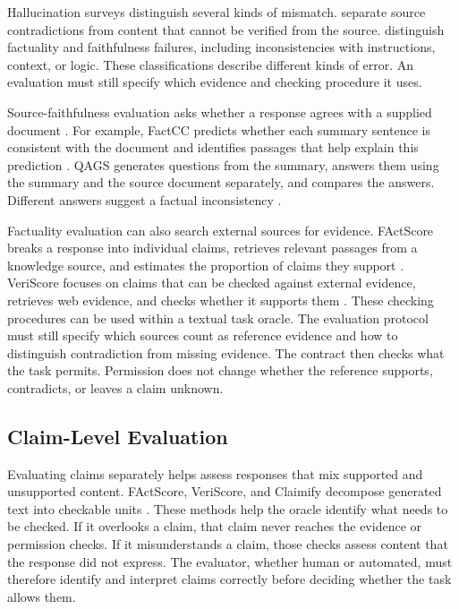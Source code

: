\documentclass{clv2025}
\begin{document}
Hallucination surveys distinguish several kinds of mismatch.
\citet{ji_survey_2023} separate source contradictions from content that cannot
be verified from the source. \citet{huang_survey_2025} distinguish factuality
and faithfulness failures, including inconsistencies with instructions,
context, or logic. These classifications describe different kinds of error.
An evaluation must still specify which evidence and checking procedure it uses.

Source-faithfulness evaluation asks whether a response agrees with a supplied
document \citep{maynez_faithfulness_2020}. For example, FactCC predicts whether
each summary sentence is consistent with the document and identifies
passages that help explain this prediction \citep{kryscinski_evaluating_2020}.
QAGS generates questions from the summary, answers them using the summary
and the source document separately, and compares the answers. Different
answers suggest a factual inconsistency \citep{wang_asking_2020}.

Factuality evaluation can also search external sources for evidence.
FActScore breaks a response into individual claims, retrieves relevant
passages from a knowledge source, and estimates the proportion of claims
they support \citep{min_factscore_2023}. VeriScore focuses on claims that
can be checked against external evidence, retrieves web evidence, and
checks whether it supports them \citep{song_veriscore_2024}.
These checking procedures can be used within a textual task oracle.
The evaluation protocol must still specify which sources count as reference
evidence and how to distinguish contradiction from missing evidence.
The contract then checks what the task permits. Permission does not change
whether the reference supports, contradicts, or leaves a claim unknown.

\subsection{Claim-Level Evaluation}\label{subsec:extraction}

Evaluating claims separately helps assess responses that mix supported and
unsupported content.
FActScore, VeriScore, and Claimify decompose generated text into checkable units
\citep{min_factscore_2023,song_veriscore_2024,metropolitansky_claimify_2025}.
These methods help the oracle identify what needs to be checked. If it
overlooks a claim, that claim never reaches the evidence or permission
checks. If it misunderstands a claim, those checks assess content that the
response did not express. The evaluator, whether human or automated, must therefore identify and
interpret claims correctly before deciding whether the task allows them.
\end{document}
